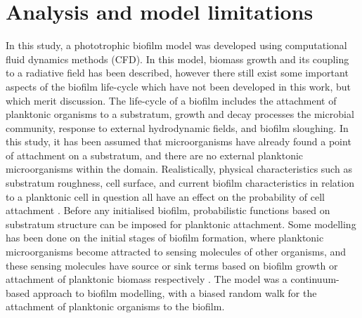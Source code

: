 \section{Analysis and model limitations}
In this study, a phototrophic biofilm model was developed using computational fluid dynamics methods (CFD). In this model, biomass growth and its coupling to a radiative field has been described, however there still exist some important aspects of the biofilm life-cycle which have not been developed in this work, but which merit discussion. The life-cycle of a biofilm includes the attachment of planktonic organisms to a substratum, growth and decay processes the microbial community, response to external hydrodynamic fields, and biofilm sloughing.
\skippingparagraph
In this study, it has been assumed that microorganisms have already found a point of attachment on a substratum, and there are no external planktonic microorganisms within the domain. Realistically, physical characteristics such as substratum roughness, cell surface, and current biofilm characteristics in relation to a planktonic cell in question all have an effect on the probability of cell attachment \cite{donlan2002}. Before any initialised biofilm, probabilistic functions based on substratum structure can be imposed for planktonic attachment. Some modelling has been done on the initial stages of biofilm formation, where planktonic microorganisms become attracted to sensing molecules of other organisms, and these sensing molecules have source or sink terms based on biofilm growth or attachment of planktonic biomass respectively \cite{moustaid2013}. The model was a continuum-based approach to biofilm modelling, with a biased random walk for the attachment of planktonic organisms to the biofilm. 
\skippingparagraph
